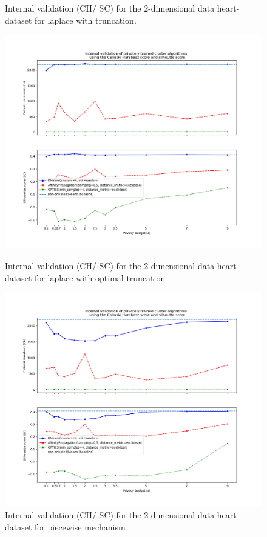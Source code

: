 \begin{figure}[H]
\begin{minipage}[c]{0.49\textwidth}
        \caption{Internal validation (CH/ SC) for the 2-dimensional data heart-dataset for laplace with truncation.}
        \label{fig:appendix-internal-validation-heart-dataset_comparison_2d-laplace-truncated}
    \end{minipage}
    \begin{minipage}[c]{0.49\textwidth}
        \includegraphics[width=1\textwidth]{Results/2d-laplace-optimal-truncated/heart-dataset/ch-and-sc.png}
        \caption{Internal validation (CH/ SC) for the 2-dimensional data heart-dataset for laplace with optimal truncation}
        \label{fig:appendix-internal-validation-heart-dataset_comparison_2d-laplace-optimal-truncated}
    \end{minipage}
    \begin{minipage}[c]{0.49\textwidth}
        \includegraphics[width=1\textwidth]{Results/2d-piecewise/heart-dataset/ch-and-sc.png}
        \caption{Internal validation (CH/ SC) for the 2-dimensional data heart-dataset for piecewise mechanism}
        \label{fig:appendix-internal-validation-heart-dataset_comparison_2d-piecewise}
    \end{minipage}
\end{figure}
